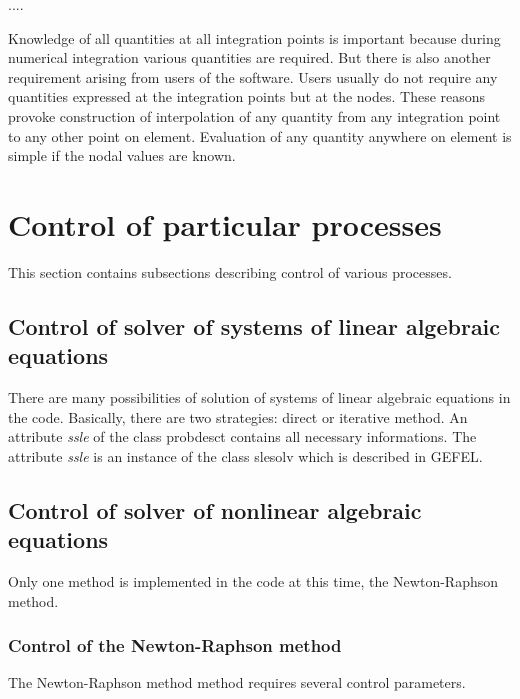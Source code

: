 ....

Knowledge of all quantities at all integration points is important because during numerical integration
various quantities are required. But there is also another requirement arising from users of the software.
Users usually do not require any quantities expressed at the integration points but at the nodes.
These reasons provoke construction of interpolation of any quantity from any integration point to any other
point on element. Evaluation of any quantity anywhere on element is simple if the nodal values are known.

\section{Control of particular processes}

This section contains subsections describing control of various processes.

\subsection{Control of solver of systems of linear algebraic equations}
\label{sectcontrlineqsolver}

There are many possibilities of solution of systems of linear algebraic equations in the code. Basically,
there are two strategies: direct or iterative method. An attribute {\it ssle} of the class {\sf probdesct}
contains all necessary informations. The attribute {\it ssle} is an instance of the class {\sf slesolv} which
is described in GEFEL.

\subsection{Control of solver of nonlinear algebraic equations}

Only one method is implemented in the code at this time, the Newton-Raphson method.

\subsubsection{Control of the Newton-Raphson method}

The Newton-Raphson method method requires several control parameters.

